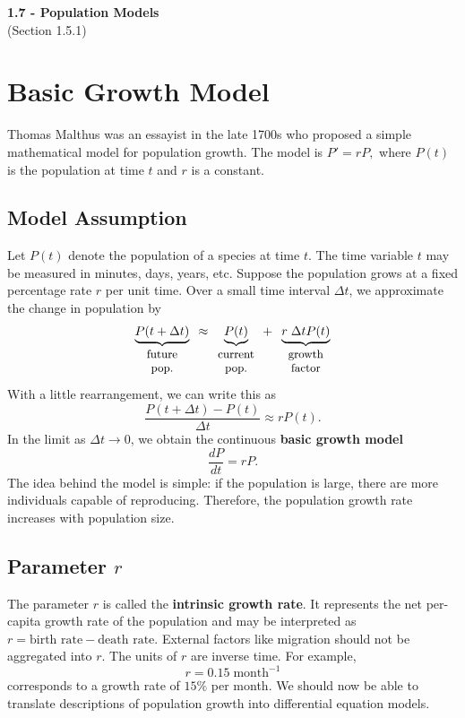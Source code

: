 \documentclass[09pt,letterpaper]{article}
\begin{document}
\begin{center}
\Large\textbf{1.7 - Population Models}\\
\normalsize (Section 1.5.1)
\end{center}

\section{Basic Growth Model}

Thomas Malthus was an essayist in the late 1700s who proposed a simple
mathematical model for population growth. The model is
$P'=rP,$
where $P(t)$ is the population at time $t$ and $r$ is a constant.



\subsection{Model Assumption}

Let $P(t)$ denote the population of a species at time $t$. The time variable
$t$ may be measured in minutes, days, years, etc. Suppose the population grows at a fixed percentage rate $r$ per unit time.
Over a small time interval $\Delta t$, we approximate the change in
population by
\[
\underbrace{P(t+\Delta t) }_{\small\begin{array}{c}
    \text{future}\\
    \text{pop.}
  \end{array}} 
\;\,\approx 
\underbrace{P(t)}_{\small\begin{array}{c}
    \text{current}\\
    \text{pop.}
  \end{array}}
  +\;\;
\underbrace{r\; \Delta t P(t)}_{ \small \begin{array}{c}
    \text{growth}\\
    \text{factor}
  \end{array}}
\]
With a little rearrangement, we can write this as
\[
\frac{P(t+\Delta t)-P(t)}{\Delta t}
\approx rP(t).
\]
In the limit as $\Delta t\to0$, we obtain the continuous \textbf{basic growth model}
\[
\frac{dP}{dt}=rP.
\]
The idea behind the model is simple: if the population is large, there are
more individuals capable of reproducing. Therefore, the population growth
rate increases with population size.

\subsection{Parameter $r$}
The parameter $r$ is called the \textbf{intrinsic growth rate}. It represents
the net per-capita growth rate of the population and may be interpreted as $r = \text{birth rate} - \text{death rate}$. External factors like migration should not be aggregated into $r$. The units of $r$ are inverse time. For example,
\[
r=0.15\;\text{month}^{-1}
\]
corresponds to a growth rate of $15\%$ per month.
We should now be able to translate descriptions of population growth into
differential equation models.
\end{document}
